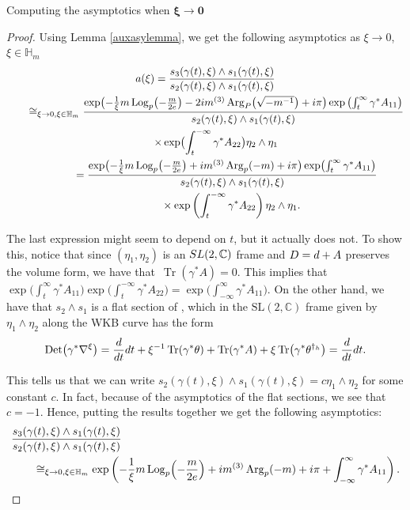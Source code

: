 \documentclass[11pt]{article}
\numberwithin{equation}{section}
\numberwithin{equation}{section}
\begin{document}
\begin{subsubsection}{Computing the asymptotics when $\boldsymbol{\xi \to 0}$}
\begin{proof}
Using Lemma \ref{auxasylemma}, we get the following asymptotics as $\xi \to 0$, $\xi \in \mathbb{H}_m$
\begin{gather*}
 a(\xi)=\frac{s_3(\gamma(t),\xi)\wedge s_1(\gamma(t),\xi)}{s_2(\gamma(t),\xi)\wedge s_1(\gamma(t),\xi)}\\
 \hphantom{a(\xi)}
 \cong_{\xi \to 0, \xi \in \mathbb{H}_m}\frac{\exp \bigl(-\frac{1}{\xi}m\operatorname{Log}_p\bigl(-\frac{m}{2e}\bigr)-2{\rm i}m^{(3)}\operatorname{Arg}_P\bigl(\sqrt{-m^{-1}}\bigr)+{\rm i}\pi\bigr)\exp \left(\int_{t}^{\infty}\gamma^*A_{11}\right)}{s_2(\gamma(t),\xi)\wedge s_1(\gamma(t),\xi)}\\
 \qquad\times\exp \bigl(\int_{t}^{-\infty}\gamma^*A_{22}\bigr)\eta_2\wedge \eta_1\\
\qquad\qquad =\frac{\exp \bigl(-\frac{1}{\xi}m\operatorname{Log}_p\bigl(-\frac{m}{2e}\bigr)+{\rm i}m^{(3)}\operatorname{Arg}_p(-m)+{\rm i}\pi\bigr)\exp \bigl(\int_{t}^{\infty}\gamma^*A_{11}\bigr)}{s_2(\gamma(t),\xi)\wedge s_1(\gamma(t),\xi)}\\
 \qquad\qquad \phantom{=}{}\times\exp \left(\int_{t}^{-\infty}\gamma^*A_{22}\right)\eta_2\wedge \eta_1.
\end{gather*}

The last expression might seem to depend on $t$, but it actually does not. To show this, notice that since $(\eta_1,\eta_2)$ is an ${\rm SL}(2,\mathbb{C})$ frame and $D={\rm d}+A$ preserves the volume form, we have that~${\operatorname{Tr}(\gamma^*A)=0}$. This implies that $\exp \bigl(\int_{t}^{\infty}\gamma^*A_{11}\bigr)\exp \bigl(\int_{t}^{-\infty}\gamma^*A_{22}\bigr)=\exp \bigl(\int_{-\infty}^{\infty}\gamma^*A_{11}\bigr)$. On the other hand, we have that $s_2\wedge s_1$ is a flat section of , which in the $\mathrm{SL}(2,\mathbb{C})$ frame given by $\eta_1\wedge \eta_2$ along the WKB curve has the form
\begin{equation*}
\operatorname{Det}\bigl(\gamma^*\nabla^{\xi}\bigr)=\frac{{\rm d}}{{\rm d}t}{\rm d}t +\xi^{-1}\operatorname{Tr}(\gamma^* \theta)+\operatorname{Tr}(\gamma^* A) + \xi \operatorname{Tr}\bigl(\gamma^* \theta^{\dagger_h}\bigr) = \frac{{\rm d}}{{\rm d}t}{\rm d}t.
\end{equation*}

This tells us that we can write
$
s_2(\gamma(t),
\xi)\wedge s_1(\gamma(t),\xi)=c\eta_1\wedge \eta_2
$
for some constant $c$. In fact, because of the asymptotics of the flat sections, we see that $c=-1$. Hence, putting the results together we get the following asymptotics:
\begin{align*}
& \frac{s_3(\gamma(t),\xi)\wedge s_1(\gamma(t),\xi)}{s_2(\gamma(t),\xi)\wedge s_1(\gamma(t),\xi)}
\\
& \qquad{}\cong_{\xi \to 0, \xi \in \mathbb{H}_m} \exp \left(-\frac{1}{\xi}m\operatorname{Log}_p\Bigl(-\frac{m}{2e}\Bigr)+{\rm i}m^{(3)}\operatorname{Arg}_p(-m)+{\rm i}\pi
 +\int_{-\infty}^{\infty}\gamma^*A_{11}\right).
\end{align*}


\end{proof}
\end{subsubsection}
\end{document}

